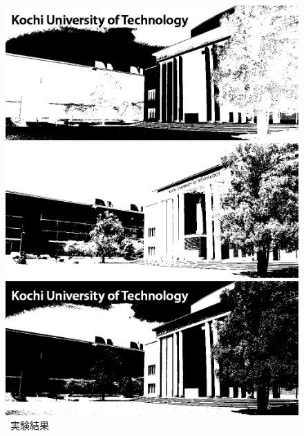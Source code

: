 \begin{figure}[H]
\begin{minipage}[b]{.23\textwidth}
    \end{minipage}
    \begin{minipage}[b]{.23\textwidth}
        \centering
        \includegraphics[keepaspectratio,width=\textwidth]{../../Figures/05_34_1.png}
    \end{minipage}
    \caption{\kadaiac\ 実験結果}
    \vsp
    \begin{minipage}[b]{.7\textwidth}
        \centering
        \begin{minipage}[b]{.3\textwidth}
            \centering
            \includegraphics[keepaspectratio,width=\textwidth]{../../Figures/05_41.png}
        \end{minipage}
        \begin{minipage}[b]{.3\textwidth}
            \centering
            \includegraphics[keepaspectratio,width=\textwidth]{../../Figures/05_42.png}

\end{minipage}
\end{minipage}
\end{figure}
